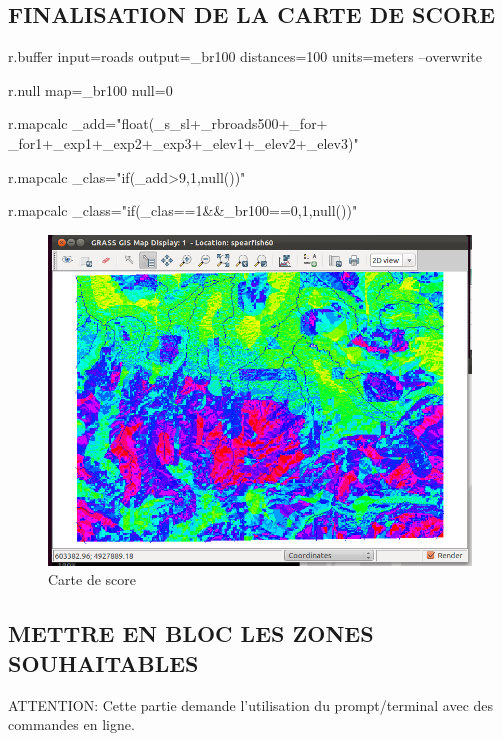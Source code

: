 \subsection{FINALISATION DE LA CARTE DE SCORE}

\begin{smallverbatim}
r.buffer input=roads output=_br100
 distances=100 units=meters --overwrite

r.null map=_br100 null=0

r.mapcalc _add="float(_s_sl+_rbroads500+_for+
 _for1+_exp1+_exp2+_exp3+_elev1+_elev2+_elev3)"

r.mapcalc _clas="if(_add>9,1,null())"

r.mapcalc _class="if(_clas==1&&_br100==0,1,null())"
\end{smallverbatim}

\begin{figure}[htbp]
   \centering
   \includegraphics[scale=0.35]{grass021.png}
   \caption{Carte de score}
   \label{fig:grass021}
\end{figure}

\subsection{METTRE EN BLOC LES ZONES SOUHAITABLES}
ATTENTION: Cette partie demande l'utilisation du prompt/terminal avec des commandes en ligne.

